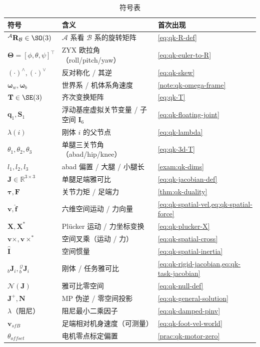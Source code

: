 \begin{table}[H]\centering\small
\caption{符号表}
\begin{tabular}{lll}
\toprule
符号 & 含义 & 首次出现 \\
\midrule
${}^{\mathcal{A}}\mathbf{R}_{\mathcal{B}}\in\SO(3)$ & $\mathcal{A}$ 系看 $\mathcal{B}$ 系的旋转矩阵 & \cref{eq:qk-R-def} \\
$\boldsymbol{\Theta}=[\phi,\theta,\psi]^\top$ & ZYX 欧拉角（roll/pitch/yaw） & \cref{eq:qk-euler-to-R} \\
$(\cdot)^\wedge,(\cdot)^\vee$ & 反对称化 / 其逆 & \cref{eq:qk-skew} \\
$\boldsymbol{\omega}_w,\boldsymbol{\omega}_b$ & 世界系 / 机体系角速度 & \cref{note:qk-omega-frame} \\
$\mathbf{T}\in\SE(3)$ & 齐次变换矩阵 & \cref{eq:qk-T} \\
$\boldsymbol{q}_1,\mathbf{S}_1$ & 浮动基座虚拟关节变量 / 子空间 $\mathbf{I}_6$ & \cref{eq:qk-floating-joint} \\
$\lambda(i)$ & 刚体 $i$ 的父节点 & \cref{eq:qk-lambda} \\
$\theta_1,\theta_2,\theta_3$ & 单腿三关节角（abad/hip/knee） & \cref{eq:qk-3d-T} \\
$l_1,l_2,l_3$ & abad 偏置 / 大腿 / 小腿长 & \cref{exam:qk-dims} \\
$\mathbf{J}\in\mathbb{R}^{3\times3}$ & 单腿足端雅可比 & \cref{eq:qk-jacobian-def} \\
$\boldsymbol{\tau},\mathbf{F}$ & 关节力矩 / 足端力 & \cref{thm:qk-duality} \\
$\boldsymbol{v},\hat{\boldsymbol{f}}$ & 六维空间运动 / 力向量 & \cref{eq:qk-spatial-vel,eq:qk-spatial-force} \\
$\mathbf{X},\mathbf{X}^{*}$ & Plücker 运动 / 力坐标变换 & \cref{eq:qk-plucker-X} \\
$\boldsymbol{v}\times,\boldsymbol{v}\times^{*}$ & 空间叉乘（运动 / 力） & \cref{eq:qk-spatial-cross} \\
$\hat{\mathbf{I}}$ & 空间惯量 & \cref{eq:qk-spatial-inertia} \\
${}_{b}\mathbf{J}_i,{}_{b}^{\mathcal{Q}}\mathbf{J}_i$ & 刚体 / 任务雅可比 & \cref{eq:qk-rigid-jacobian,eq:qk-task-jacobian} \\
$\mathcal{N}(\mathbf{J})$ & 雅可比零空间 & \cref{eq:qk-null-def} \\
$\mathbf{J}^{+},\mathbf{N}$ & MP 伪逆 / 零空间投影 & \cref{eq:qk-general-solution} \\
$\lambda$（阻尼） & 阻尼最小二乘因子 & \cref{eq:qk-damped-pinv} \\
$\boldsymbol{v}_{sfB}$ & 足端相对机身速度（可测量） & \cref{eq:qk-foot-vel-world} \\
$\theta_{offset}$ & 电机零点标定偏置 & \cref{prac:qk-motor-zero} \\
\bottomrule
\end{tabular}
\end{table}

